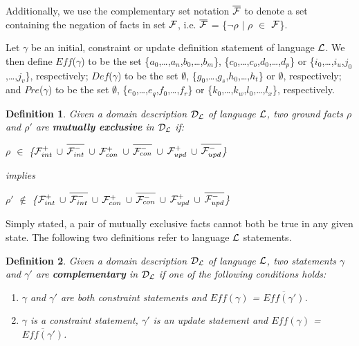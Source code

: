 \documentclass[11pt, twocolumn]{article}
\newtheorem{vdefinition}{Definition}
\newenvironment{vquote}
  {\begin{list}{}{\leftmargin 1em}\item[]}
  {\end{list}}
\begin{document}
    Additionally, we use the complementary set notation
    $\overline{{\cal F}}$ to denote a set containing the negation of
    facts in set ${\cal F}$, i.e. $\overline{{\cal F}}$ =
    \{$\lnot\rho$ $\mid$ $\rho$ $\in$ ${\cal F}$\}.

    Let $\gamma$ be an initial, constraint or update definition statement of
    language ${\cal L}$. We then define $Eff$($\gamma$) to be the set
    \{$a_{0}$,\ldots,$a_{n}$,$b_{0}$,\ldots,$b_{m}$\},
    \{$c_{0}$,\ldots,$c_{o}$,$d_{0}$,\ldots,$d_{p}$\} or
    \{$i_{0}$,\ldots,$i_{u}$,$j_{0}$,\ldots,$j_{v}$\}, respectively;
    $Def$($\gamma$) to be the set $\emptyset$,
    \{$g_{0}$,\ldots,$g_{s}$,$h_{0}$,\ldots,$h_{t}$\} or
    $\emptyset$, respectively; and $Pre$($\gamma$) to be the set
    $\emptyset$, \{$e_{0}$,\ldots,$e_{q}$,$f_{0}$,\ldots,$f_{r}$\} or
    \{$k_{0}$,\ldots,$k_{w}$,$l_{0}$,\ldots,$l_{x}$\}, respectively.

    \begin{vdefinition}
      \label{def-mutex}
      Given a domain description ${\cal D_{L}}$ of language ${\cal L}$,
      two ground facts $\rho$ and $\rho'$ are {\bf mutually exclusive}
      in ${\cal D_{L}}$ if:
      \begin{vquote}
        $\rho$ $\in$ \{${\cal F}^{+}_{int}$ $\cup$
        $\overline{{\cal F}^{-}_{int}}$ $\cup$ ${\cal F}^{+}_{con}$ $\cup$
        $\overline{{\cal F}^{-}_{con}}$ $\cup$ ${\cal F}^{+}_{upd}$ $\cup$
        $\overline{{\cal F}^{-}_{upd}}$\}

        implies

        $\rho'$ $\not\in$ \{${\cal F}^{+}_{int}$ $\cup$
        $\overline{{\cal F}^{-}_{int}}$ $\cup$ ${\cal F}^{+}_{con}$ $\cup$
        $\overline{{\cal F}^{-}_{con}}$ $\cup$ ${\cal F}^{+}_{upd}$ $\cup$
        $\overline{{\cal F}^{-}_{upd}}$\}
      \end{vquote}
    \end{vdefinition}

    Simply stated, a pair of mutually exclusive facts cannot both be true
    in any given state. The following two definitions refer to language
    ${\cal L}$ statements.

    \begin{vdefinition}
      \label{def-comp}
      Given a domain description ${\cal D_{L}}$ of language ${\cal L}$,
      two statements $\gamma$ and $\gamma'$ are {\bf complementary} in
      ${\cal D_{L}}$ if one of the following conditions holds:
      \begin{enumerate}
        \item
          $\gamma$ and $\gamma'$ are both constraint statements and
          $Eff(\gamma)$ = $\overline{Eff(\gamma')}$.
        \item
          $\gamma$ is a constraint statement, $\gamma'$ is an update
          statement and $Eff(\gamma)$ = $\overline{Eff(\gamma')}$.
      \end{enumerate}
    \end{vdefinition}
\end{document}
